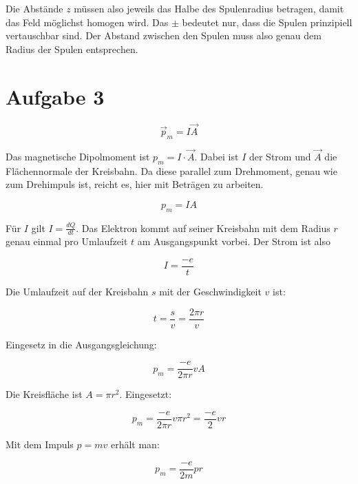 \documentclass[a4paper,german,12pt,smallheadings]{scrartcl}
\begin{document}
Die Abstände $z$ müssen also jeweils das Halbe des Spulenradius betragen,
damit das Feld möglichst homogen wird. Das $\pm$ bedeutet nur, dass die Spulen
prinzipiell vertauschbar sind. Der Abstand zwischen den Spulen muss also genau
dem Radius der Spulen entsprechen.

\section*{Aufgabe 3}

\begin{equation*}
  \vec{p}_m = I \vec{A}
\end{equation*}

Das magnetische Dipolmoment ist $p_m = I \cdot \vec{A}$. Dabei ist $I$ der
Strom und $\vec{A}$ die Flächennormale der Kreisbahn. Da diese parallel zum
Drehmoment, genau wie zum Drehimpuls ist, reicht es, hier mit Beträgen zu
arbeiten.

\begin{equation*}
  p_m = I A
\end{equation*}

Für $I$ gilt $I = \frac{dQ}{dt}$. Das Elektron kommt auf seiner Kreisbahn mit
dem Radius $r$ genau einmal pro Umlaufzeit $t$ am Ausgangspunkt vorbei. Der
Strom ist also

\begin{equation*}
  I = \frac{-e}{t}
\end{equation*}

Die Umlaufzeit auf der Kreisbahn $s$ mit der Geschwindigkeit $v$ ist:

\begin{equation*}
  t = \frac{s}{v} = \frac{2 \pi r}{v}
\end{equation*}

Eingesetz in die Ausgangsgleichung:

\begin{equation*}
  p_m = \frac{-e}{2 \pi r} v A
\end{equation*}

Die Kreisfläche ist $A = \pi r^2$. Eingesetzt:

\begin{equation*}
  p_m = \frac{-e}{2 \pi r} v \pi r^2 = \frac{-e}{2} v r
\end{equation*}

Mit dem Impuls $p = mv$ erhält man:

\begin{equation*}
  p_m = \frac{-e}{2m} p r
\end{equation*}
\end{document}

